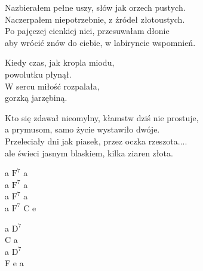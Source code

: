 \begin{text}
    Nazbierałem pełne uszy, słów jak orzech pustych.\\
    Naczerpałem niepotrzebnie, z źródeł złotoustych.\\
    Po pajęczej cienkiej nici, przesuwałam dłonie\\
    aby wrócić znów do ciebie, w labiryncie wspomnień.

    Kiedy czas, jak kropla miodu,\\
    powolutku płynął.\\
    W sercu miłość rozpalała,\\
    gorzką jarzębiną.

    Kto się zdawał nieomylny, kłamstw dziś nie prostuje,\\
    a prymusom, samo życie wystawiło dwóje.\\
    Przeleciały dni jak piasek, przez oczka rzeszota....\\
    ale świeci jasnym blaskiem, kilka ziaren złota.
\end{text}
\begin{chord}
    a $\mathrm{F^{7}}$ a\\
    a $\mathrm{F^{7}}$ a\\
    a $\mathrm{F^{7}}$ a\\
    a $\mathrm{F^{7}}$ C e

    a $\mathrm{D^{7}}$\\
    C a\\
    a $\mathrm{D^{7}}$\\
    F e a
\end{chord}
